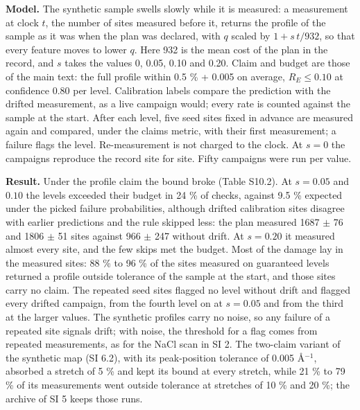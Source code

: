 \documentclass{iopjournal}
\begin{document}
\textbf{Model.} The synthetic sample swells slowly while it is measured: a measurement at clock \(t\), the number of sites measured before it, returns the profile of the sample as it was when the plan was declared, with \(q\) scaled by \(1 + s\,t/932\), so that every feature moves to lower \(q\). Here 932 is the mean cost of the plan in the record, and \(s\) takes the values 0, 0.05, 0.10 and 0.20. Claim and budget are those of the main text: the full profile within 0.5 \% + 0.005 on average, \(R_E \le 0.10\) at confidence 0.80 per level. Calibration labels compare the prediction with the drifted measurement, as a live campaign would; every rate is counted against the sample at the start. After each level, five seed sites fixed in advance are measured again and compared, under the claim\textquotesingle s metric, with their first measurement; a failure flags the level. Re-measurement is not charged to the clock. At \(s = 0\) the campaigns reproduce the record site for site. Fifty campaigns were run per value.

\textbf{Result.} Under the profile claim the bound broke (Table S10.2). At \(s = 0.05\) and \(0.10\) the levels exceeded their budget in 24 \% of checks, against 9.5 \% expected under the picked failure probabilities, although drifted calibration sites disagree with earlier predictions and the rule skipped less: the plan measured 1687 \ensuremath{\pm} 76 and 1806 \ensuremath{\pm} 51 sites against 966 \ensuremath{\pm} 247 without drift. At \(s = 0.20\) it measured almost every site, and the few skips met the budget. Most of the damage lay in the measured sites: 88 \% to 96 \% of the sites measured on guaranteed levels returned a profile outside tolerance of the sample at the start, and those sites carry no claim. The repeated seed sites flagged no level without drift and flagged every drifted campaign, from the fourth level on at \(s = 0.05\) and from the third at the larger values. The synthetic profiles carry no noise, so any failure of a repeated site signals drift; with noise, the threshold for a flag comes from repeated measurements, as for the NaCl scan in SI 2. The two-claim variant of the synthetic map (SI 6.2), with its peak-position tolerance of 0.005 \AA{}\ensuremath{^{-1}}, absorbed a stretch of 5 \% and kept its bound at every stretch, while 21 \% to 79 \% of its measurements went outside tolerance at stretches of 10 \% and 20 \%; the archive of SI 5 keeps those runs.
\end{document}
